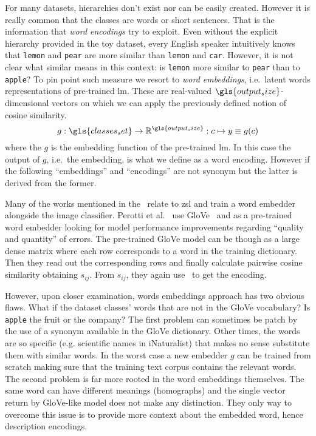 For many datasets, hierarchies don't exist nor can be easily created. However it
is really common that the classes are words or short sentences. That is the
information that \emph{word encodings} try to exploit. Even without the explicit
hierarchy provided in the toy dataset, every English speaker intuitively knows
that \texttt{lemon} and \texttt{pear} are more similar than \texttt{lemon} and
\texttt{car}. However, it is not clear what similar means in this context: is
\texttt{lemon} more similar to \texttt{pear} than to \texttt{apple}? To pin
point such measure we resort to \emph{word embeddings}, i.e.\ latent words
representations of pre-trained \acrshort{lm}. These are real-valued
$\gls{output_size}$-dimensional vectors on which we can apply the previously
defined notion of cosine similarity.
\begin{equation}
  g : \gls{classes_set} \to \mathbb{R}^{\gls{output_size}} :
  c \mapsto y \equiv g(c)
  \label{eq:word-encoding}
\end{equation}
where the $g$ is the embedding function of the pre-trained \acrshort{lm}. In
this case the output of $g$, i.e.\ the embedding, is what we define as a word
encoding. However if the following ``embeddings'' and ``encodings'' are not
synonym but the latter is derived from the former.

Many of the works mentioned in the~ relate to
\acrshort{zsl} and train a word embedder alongside the image classifier. Perotti
et al.~\cite{BeyondOneHotPerott2023} use GloVe~\cite{GloveGlobalVPennin2014} and
as a pre-trained word embedder looking for model performance improvements
regarding ``quality and quantity'' of errors. The pre-trained GloVe model can be
though as a large dense matrix where each row corresponds to a word in the
training dictionary. Then they read out the corresponding rows and finally
calculate pairwise cosine similarity obtaining $s_{ij}$. From $s_{ij}$, they
again use~ to get the encoding.

However, upon closer examination, words embeddings approach has two obvious
flaws. What if the dataset classes' words that are not in the GloVe vocabulary?
Is \texttt{apple} the fruit or the company? The first problem can sometimes be
patch by the use of a synonym available in the GloVe dictionary. Other times,
the words are so specific (e.g. scientific names in iNaturalist) that makes no
sense substitute them with similar words. In the worst case a new embedder $g$
can be trained from scratch making sure that the training text corpus contains
the relevant words. The second problem is far more rooted in the word embeddings
themselves. The same word can have different meanings (homographs) and the
single vector return by GloVe-like model does not make any distinction. They
only way to overcome this issue is to provide more context about the embedded
word, hence description encodings.

